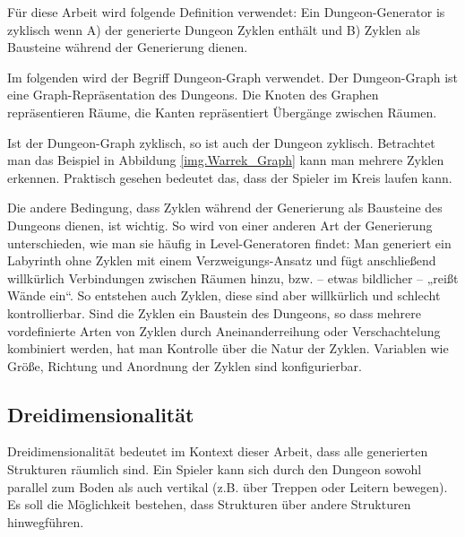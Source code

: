 Für diese Arbeit wird folgende Definition verwendet: Ein Dungeon-Generator is zyklisch wenn A) der generierte Dungeon Zyklen enthält und B) Zyklen als Bausteine während der Generierung dienen.

Im folgenden wird der Begriff Dungeon-Graph verwendet. Der Dungeon-Graph ist eine Graph-Repräsentation des Dungeons. Die Knoten des Graphen repräsentieren Räume, die Kanten repräsentiert Übergänge zwischen Räumen. 


Ist der Dungeon-Graph zyklisch, so ist auch der Dungeon zyklisch. Betrachtet man das Beispiel in Abbildung \ref{img.Warrek_Graph} kann man mehrere Zyklen erkennen. Praktisch gesehen bedeutet das, dass der Spieler im Kreis laufen kann. 

Die andere Bedingung, dass Zyklen während der Generierung als Bausteine des Dungeons dienen, ist wichtig. So wird von einer anderen Art der Generierung unterschieden, wie man sie häufig in Level-Generatoren findet: Man generiert ein Labyrinth ohne Zyklen mit einem Verzweigungs-Ansatz und fügt anschließend willkürlich Verbindungen zwischen Räumen hinzu, bzw. -- etwas bildlicher -- „reißt Wände ein“. So entstehen auch Zyklen, diese sind aber willkürlich und schlecht kontrollierbar. Sind die Zyklen ein Baustein des Dungeons, so dass mehrere vordefinierte Arten von Zyklen durch Aneinanderreihung oder Verschachtelung kombiniert werden, hat man Kontrolle über die Natur der Zyklen. Variablen wie Größe, Richtung und Anordnung der Zyklen sind konfigurierbar.

\subsection{Dreidimensionalität}

Dreidimensionalität bedeutet im Kontext dieser Arbeit, dass alle generierten Strukturen räumlich sind. Ein Spieler kann sich durch den Dungeon sowohl parallel zum Boden als auch vertikal (z.B. über Treppen oder Leitern bewegen). Es soll die Möglichkeit bestehen, dass Strukturen über andere Strukturen hinwegführen.


